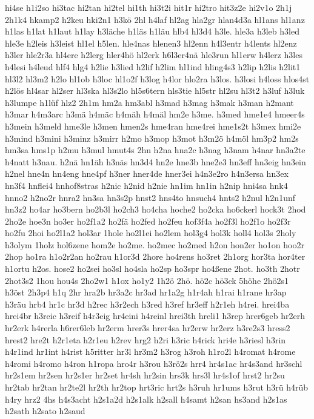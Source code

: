 {hi4se
h1i2so
hi3tac
hi2tan
hi2tel
hi1th
hi3t2i
hit1r
hi2tro
hit3z2e
hi2v1o
2h1j
2h1k4
hkamp2
h2keu
hki2n1
h3kö
2hl
h4laf
hl2ag
hla2gr
hlan4d3a
hl1ans
hl1anz
h1las
h1lat
h1laut
h1lay
h3läche
h1läs
h1läu
hlb4
hl3d4
h3le.
hle3a
h3leb
h3led
hle3e
h2leis
h3leist
hl1el
h5len.
hle4nas
hlenen3
hl2enn
h4l3entr
h4lents
hl2enz
h3ler
hle2r3a
hl4ere
h2lerg
hler4hö
hl2erk
h6l3er4nä
hle3run
hl1erw
h4lerz
h3les
h4lesi
h4leud
hlf4
hlg4
h2lie
h3lied
h2lif
h2lim
hl1ind
hling4s3
h2lip
h2lis
h2lit1
hl3l2
hl3m2
h2lo
hl1ob
h3loc
hl1o2f
h3log
h4lor
hlo2ra
h3los.
h3losi
h4loss
hlos4st
h2lös
hl4sar
hl2ser
hl3ska
hl3s2lo
hl5s6tern
hls3tie
hl5str
hl2su
hl3t2
h3luf
h3luk
h3lumpe
h1lüf
hlz2
2h1m
hm2a
hm3abl
h3mad
h3mag
h3mak
h3man
h2mant
h3mar
h4m3arc
h3mä
h4mäc
h4mäh
h4mäl
hm2e
h3me.
h3med
hme1e4
hmeer4s
h3mein
h3meld
hme3le
h3men
hmen2s
hme4ran
hme4rei
hme1s2t
h3mex
hmi2e
h3mind
h3mini
h3minz
h3mirr
h2mo
h3mop
h3mot
h3m2ö
h4möl
hm3p2
hm2s
hm3sa
hms1p
h2mu
h3mul
hmut4s
2hn
h2na
hna2c
h3nag
h3nam
h4nar
hn3a2te
h4natt
h3nau.
h2nä
hn1äh
h3näs
hn3d4
hn2e
hne3b
hne2e3
hn3eff
hn3eig
hn3ein
h2nel
hne4n
hn4eng
hne4pf
h3ner
hner4de
hner3ei
h4n3e2ro
h4n3ersa
hn3ex
hn3f4
hnflei4
hnhof8stras
h2nic
h2nid
h2nie
hn1im
hn1in
h2nip
hni4sa
hnk4
hnno2
h2no2r
hnra2
hn3sa
hn3s2p
hnst2
hns4to
hnsuch4
hnts2
h2nul
h2n1unf
hn3z2
ho4ar
ho3bern
ho2b3l
ho2ch3
ho4cha
hoche2
ho2cka
ho6ckerl
hock3t
2hod
2ho2e
hoe3n
ho3er
ho2f1a2
ho2fä
ho2fed
ho2feu
hof3f4a
ho2f3l
ho2f1o
ho2f3r
ho2fu
2hoi
ho2l1a2
hol3ar
1hole
ho2l1ei
ho2lem
hol3g4
hol3k
holl4
hol3s
2holy
h3olym
1holz
hol6zene
hom2e
ho2me.
ho2mec
ho2med
h2on
hon2er
ho1on
hoo2r
2hop
ho1ra
h1o2r2an
ho2rau
h1or3d
2hore
ho4rens
ho3ret
2h1org
hor3ta
hor4ter
h1ortu
h2os.
hose2
ho2sei
ho3sl
ho4sla
ho2sp
ho3spr
ho4ßene
2hot.
ho3th
2hotr
2hot3s2
1hou
hou4s
2ho2w1
h1ox
ho1y2
1h2ö
2hö.
hö2c
hö3ck
5höhe
2hö2s1
h3öst
2h3p4
h1q
2hr
hra2b
hr3a2c
hr3ad
hr1a2g
h1r4ah
h1rai
h1rane
hr3ap
h3räu
hrb4
hr1c
hr3d
h2rec
h3r2ech
h3red
h3ref
hr3eff
h2r1eh
h4rei.
hrei4ba
hrei4br
h3reic
h3reif
h4r3eig
hr4eini
h4reinl
hrei3th
hreli1
h3rep
hrer6geb
hr2erh
hr2erk
h4rerla
h6rer6leb
hr2erm
hrer3s
hrer4sa
hr2erw
hr2erz
h3re2s3
hress2
hrest2
hre2t
h2r1eta
h2r1eu
h2rev
hrg2
h2ri
h3ric
h4rick
hri4e
h3riesl
h3rin
h4r1ind
hr1int
h4rist
h5ritter
hr3l
hr3m2
h3rog
h3roh
h1ro2l
h4romat
h4rome
h4romi
h4romo
h4ron
h1ropa
hro4r
h3rou
h3rö2s
hrr4
hr4s1ac
hr4s3and
hr3schl
hr2s1em
hr2sen
hr2s1er
hr2set
hr4sh
hr2sin
hrs3k
hrs3l
hr4s1of
hrst2
hr2su
hr2tab
hr2tan
hr2te2l
hr2th
hr2top
hrt3ric
hrt2s
h3ruh
hr1ums
h3rut
h3rü
h4rüb
h4ry
hrz2
4hs
h4s3acht
h2s1a2d
h2s1alk
h2sall
h4samt
h2san
hs3and
h2s1as
h2sath
h2sato
h2saud
}
